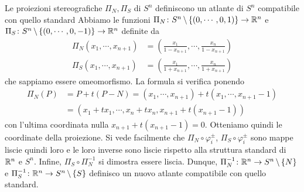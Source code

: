 \documentclass[a4paper]{article}
\begin{document}
\begin{snippetexample}{Le proiezioni stereografiche \(\Pi_N, \Pi_S\) di \(S^n\) definiscono un atlante di \(S^n\) compatibile con quello standard}
    Abbiamo le funzioni \(\Pi_N \colon S^n \,\backslash\, \{(0, \cdots, 0, 1)\} \to \mathbb{R}^n\)
    e \(\Pi_S \colon S^n \,\backslash\, \{(0, \cdots, 0, -1)\} \to \mathbb{R}^n\) definite da
    \begin{align*}
        \Pi_N(x_1, \cdots, x_{n+1}) &= \left(
            \frac{x_1}{1-x_{n+1}}, \cdots, \frac{x_n}{1 - x_{n+1}}
        \right) \\
        \Pi_S(x_1, \cdots, x_{n+1}) &= \left(
            \frac{x_1}{1+x_{n+1}}, \cdots, \frac{x_n}{1 + x_{n+1}}
        \right)
    \end{align*}
    che sappiamo essere omeomorfismo.
    La formula si verifica ponendo
    \begin{align*}
        \Pi_N(P) &= P + t(P-N) = (x_1, \cdots, x_{n+1}) + t(x_1, \cdots, x_{n+1} - 1) \\
        &= (x_1 + tx_1, \cdots, x_n + tx_n, x_{n+1} + t(x_{n+1} - 1))
    \end{align*}
    con l'ultima coordinata nulla \(x_{n+1} + t(x_{n+1}-1) = 0\). Otteniamo quindi le coordinate della proiezione.
    Si vede facilmente che \(\Pi_N \circ \varphi_i^\pm\), \(\Pi_S \circ \varphi_i^\pm\) sono mappe liscie quindi
    loro e le loro inverse sono liscie rispetto alla struttura standard di \(\mathbb{R}^n\) e \(S^n\).
    Infine, \(\Pi_S \circ \Pi_N^{-1}\) si dimostra essere liscia.
    Dunque, \(\Pi_N^{-1} \colon \mathbb{R}^n \to S^n \,\backslash\, \{N\}\)
    e \(\Pi_S^{-1} \colon \mathbb{R}^n \to S^n \,\backslash\, \{S\}\)
    definisco un nuovo atlante compatibile con quello standard.


\end{snippetexample}
\end{document}
